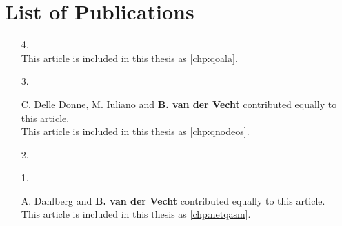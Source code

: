\chapter*{List of Publications}

\def\aicon{\makebox[1.25em][l]{\footnotesize \faUser}}
\def\ficon{\makebox[1.25em][l]{\footnotesize \faFileTextO}}
\def\picon{\makebox[1.25em][l]{\footnotesize \faPencilSquareO}}

\begin{enumerate}[label={\arabic*.},itemsep=0.7\baselineskip,parsep=0.3\baselineskip]
    \item[4.] 
        \\ \ficon This article is included in this thesis as \cref{chp:qoala}.
    \item[3.] 
        \par\aicon C. Delle Donne, M. Iuliano and \textbf{B. van der Vecht} contributed equally to this article.
        \\ \ficon This article is included in this thesis as \cref{chp:qnodeos}.
    \item[2.] 
    \item[1.] 
        \par\aicon A. Dahlberg and \textbf{B. van der Vecht} contributed equally to this article.
        \\ \ficon This article is included in this thesis as \cref{chp:netqasm}.
\end{enumerate}

\begin{xstretch}
\printbibliography[heading=subbibintoc,title={References},notcategory=noprint]
\end{xstretch}
